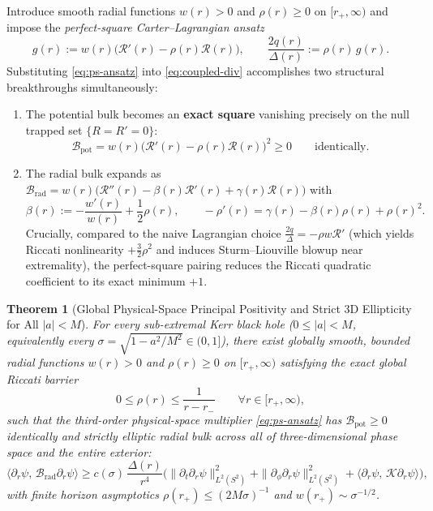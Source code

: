 \documentclass[11pt, a4paper]{article}
\newtheorem{theorem}{Theorem}[section]
\theoremstyle{remark}
\begin{document}
Introduce smooth radial functions $w(r) > 0$ and $\rho(r) \ge 0$ on $[r_+, \infty)$ and impose the \emph{perfect-square Carter--Lagrangian ansatz}
\begin{equation}
\label{eq:ps-ansatz}
g(r) := w(r)\big(\mathcal{R}'(r) - \rho(r)\mathcal{R}(r)\big), \qquad \frac{2q(r)}{\Delta(r)} := \rho(r)\, g(r).
\end{equation}
Substituting \eqref{eq:ps-ansatz} into \eqref{eq:coupled-div} accomplishes two structural breakthroughs simultaneously:
\begin{enumerate}
\item The potential bulk becomes an \textbf{exact square} vanishing precisely on the null trapped set $\{R = R' = 0\}$:
\begin{equation}
\mathcal{B}_{\mathrm{pot}} = w(r)\big(\mathcal{R}'(r) - \rho(r)\mathcal{R}(r)\big)^2 \ge 0 \qquad \text{identically.}
\end{equation}
\item The radial bulk expands as $\mathcal{B}_{\mathrm{rad}} = w(r)\big(\mathcal{R}''(r) - \beta(r)\mathcal{R}'(r) + \gamma(r)\mathcal{R}(r)\big)$ with
\begin{equation}
\label{eq:riccati-opt}
\beta(r) := -\frac{w'(r)}{w(r)} + \frac{1}{2}\rho(r), \qquad -\rho'(r) = \gamma(r) - \beta(r)\rho(r) + \rho(r)^2.
\end{equation}
Crucially, compared to the naive Lagrangian choice $\frac{2q}{\Delta} = -\rho w\mathcal{R}'$ (which yields Riccati nonlinearity $+\frac{3}{2}\rho^2$ and induces Sturm--Liouville blowup near extremality), the perfect-square pairing reduces the Riccati quadratic coefficient to its exact minimum $+1$.
\end{enumerate}

\begin{theorem}[Global Physical-Space Principal Positivity and Strict 3D Ellipticity for All $|a| < M$]
\label{thm:global-positivity}
For every sub-extremal Kerr black hole ($0 \le |a| < M$, equivalently every $\sigma = \sqrt{1 - a^2/M^2} \in (0, 1]$), there exist globally smooth, bounded radial functions $w(r) > 0$ and $\rho(r) \ge 0$ on $[r_+, \infty)$ satisfying the exact global Riccati barrier
\begin{equation}
\label{eq:exact-barrier}
0 \le \rho(r) \le \frac{1}{r - r_-} \qquad \forall r \in [r_+, \infty),
\end{equation}
such that the third-order physical-space multiplier \eqref{eq:ps-ansatz} has $\mathcal{B}_{\mathrm{pot}} \ge 0$ identically and strictly elliptic radial bulk across all of three-dimensional phase space and the entire exterior:
\begin{equation}
\label{eq:elliptic-bound}
\langle\partial_r\psi,\, \mathcal{B}_{\mathrm{rad}}\partial_r\psi\rangle \ge c(\sigma)\,\frac{\Delta(r)}{r^4}\Big(\|\partial_t\partial_r\psi\|_{L^2(S^2)}^2 + \|\partial_\phi\partial_r\psi\|_{L^2(S^2)}^2 + \langle\partial_r\psi,\, \mathcal{K}\partial_r\psi\rangle\Big),
\end{equation}
with finite horizon asymptotics $\rho(r_+) \le (2M\sigma)^{-1}$ and $w(r_+) \sim \sigma^{-1/2}$.
\end{theorem}
\end{document}
